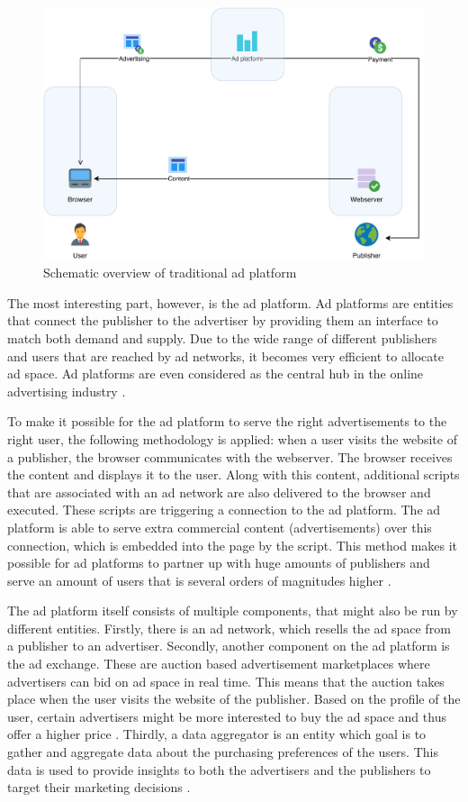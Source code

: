 \begin{figure}[h!]
  \center
  \includegraphics[width=12cm]{images/adplatform.pdf}
  \caption{Schematic overview of traditional ad platform}
\end{figure}

The most interesting part, however, is the ad platform. Ad platforms are entities that connect the publisher to the advertiser by providing them an interface to match both demand and supply. Due to the wide range of different publishers and users that are reached by ad networks, it becomes very efficient to allocate ad space. Ad platforms are even considered as the central hub in the online advertising industry \cite{estrada2017online}.

To make it possible for the ad platform to serve the right advertisements to the right user, the following methodology is applied: when a user visits the website of a publisher, the browser communicates with the webserver. The browser receives the content and displays it to the user. Along with this content, additional scripts that are associated with an ad network are also delivered to the browser and executed. These scripts are triggering a connection to the ad platform. The ad platform is able to serve extra commercial content (advertisements) over this connection, which is embedded into the page by the script. This method makes it possible for ad platforms to partner up with huge amounts of publishers and serve an amount of users that is several orders of magnitudes higher \cite{estrada2017online}.

The ad platform itself consists of multiple components, that might also be run by different entities. Firstly, there is an ad network, which resells the ad space from a publisher to an advertiser. Secondly, another component on the ad platform is the ad exchange. These are auction based advertisement marketplaces where advertisers can bid on ad space in real time. This means that the auction takes place when the user visits the website of the publisher. Based on the profile of the user, certain advertisers might be more interested to buy the ad space and thus offer a higher price \cite{estrada2017online}. Thirdly, a data aggregator is an entity which goal is to gather and aggregate data about the purchasing preferences of the users. This data is used to provide insights to both the advertisers and the publishers to target their marketing decisions \cite{estrada2017online}.

